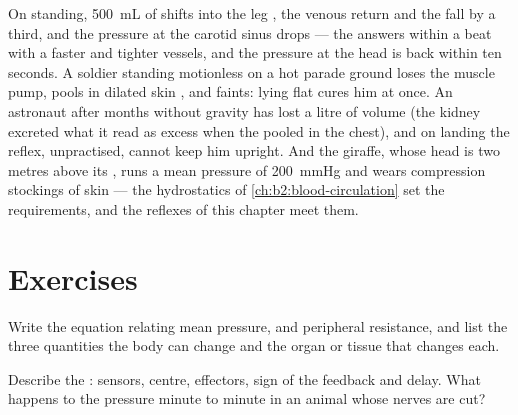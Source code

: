 \begin{example}\label{ex:b2:blood-pressure:standing}
On standing, \qty{500}{mL} of  shifts into the leg , the
venous return and the  fall by a third, and the
pressure at the carotid sinus drops --- the  answers within
a beat with a faster  and tighter vessels, and the pressure at
the head is back within ten seconds. A soldier standing motionless
on a hot parade ground loses the muscle pump, pools  in
dilated skin , and faints: lying flat cures him at once. An
astronaut after months without gravity has lost a litre of 
volume (the kidney excreted what it read as excess when the 
pooled in the chest), and on landing the reflex, unpractised, cannot
keep him upright. And the giraffe, whose head is two metres above
its , runs a mean pressure of \qty{200}{mmHg} and wears
compression stockings of skin --- the hydrostatics of
\cref{ch:b2:blood-circulation} set the requirements, and the reflexes
of this chapter meet them.
\end{example}

\section{Exercises}

\begin{exercise}[$\star$]\label{exo:b2:blood-pressure:1}
Write the equation relating mean pressure,  and
peripheral resistance, and list the three quantities the body can
change and the organ or tissue that changes each.
\end{exercise}

\begin{exercise}[$\star$]\label{exo:b2:blood-pressure:2}
Describe the : sensors, centre, effectors, sign of the
feedback and delay. What happens to the pressure minute to minute
in an animal whose  nerves are cut?
\end{exercise}

